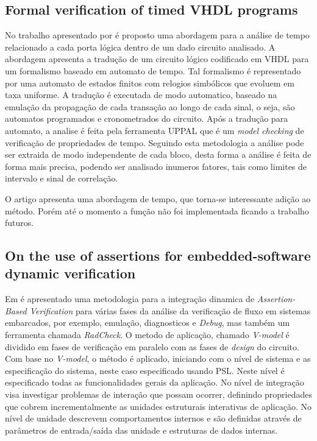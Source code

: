 \subsection{Formal verification of timed VHDL programs}
No trabalho apresentado por \citeauthor{bara2010formal} é proposto uma abordagem para a análise de tempo relacionado a cada porta lógica dentro de um dado circuito analisado. A abordagem apresenta a tradução de um circuito lógico codificado em VHDL para um formalismo baseado em automato de tempo. Tal formalismo é representado por uma automato de estados finitos com relogios simbólicos que evoluem em taxa uniforme. A tradução é executada de modo automatico, baseado na emulação da propagação de cada transação ao longo de cada sinal, o seja, são automatos programados e cronometrados do circuito. Após a tradução para automato, a analise é feita pela ferramenta UPPAL que é um \textit{model checking} de verificação de propriedades de tempo. Seguindo esta metodologia a análise pode ser extraida de modo independente de cada bloco, desta forma a análise é feita de forma mais precisa, podendo ser analisado inumeros fatores, tais como limites de intervalo e sinal de correlação.

\par
O artigo apresenta uma abordagem de tempo, que torna-se interessante adição ao método. Porém até o momento a função não foi implementada ficando a trabalho futuros.

\subsection{On the use of assertions for embedded-software dynamic verification}
Em \citeauthor{di2012use} é apresentado uma metodologia para a integração dinamica de \textit{Assertion-Based Verification} para várias fases da análise da verificação de fluxo em sistemas embarcados, por exemplo, emulação, diagnosticos e \textit{Debug}, mas também um ferramenta chamada \textit{RadCheck}. O metodo de aplicação, chamado \textit{V-model} é dividido em fases de verificação em paralelo com as fases de \textit{design} do circuito. Com base no \textit{V-model}, o método é aplicado, iniciando com o nível de sistema e as especificação do sistema, neste caso especificado usando PSL. Neste nível é especificado todas as funcionalidades gerais da aplicação. No nível de integração visa investigar problemas de interação que possam ocorrer, definindo propriedades que cobrem incrementalmente as unidades estruturais interativas de aplicação. No nível de unidade descrevem comportamentos internos e são definidas através de parâmetros de entrada/saída das unidade e estruturas de dados internas.

